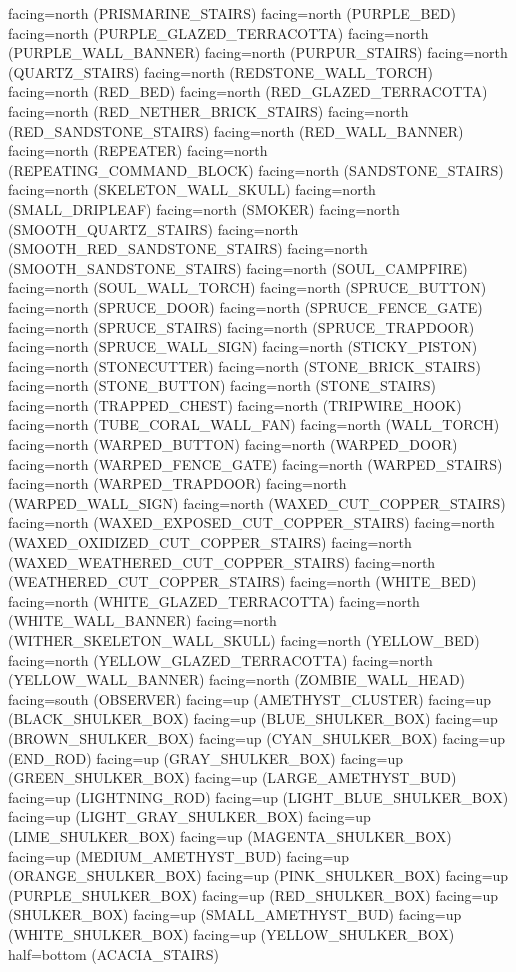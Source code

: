 \documentclass[11pt]{article}
\begin{document}
facing=north (PRISMARINE_STAIRS)
facing=north (PURPLE_BED)
facing=north (PURPLE_GLAZED_TERRACOTTA)
facing=north (PURPLE_WALL_BANNER)
facing=north (PURPUR_STAIRS)
facing=north (QUARTZ_STAIRS)
facing=north (REDSTONE_WALL_TORCH)
facing=north (RED_BED)
facing=north (RED_GLAZED_TERRACOTTA)
facing=north (RED_NETHER_BRICK_STAIRS)
facing=north (RED_SANDSTONE_STAIRS)
facing=north (RED_WALL_BANNER)
facing=north (REPEATER)
facing=north (REPEATING_COMMAND_BLOCK)
facing=north (SANDSTONE_STAIRS)
facing=north (SKELETON_WALL_SKULL)
facing=north (SMALL_DRIPLEAF)
facing=north (SMOKER)
facing=north (SMOOTH_QUARTZ_STAIRS)
facing=north (SMOOTH_RED_SANDSTONE_STAIRS)
facing=north (SMOOTH_SANDSTONE_STAIRS)
facing=north (SOUL_CAMPFIRE)
facing=north (SOUL_WALL_TORCH)
facing=north (SPRUCE_BUTTON)
facing=north (SPRUCE_DOOR)
facing=north (SPRUCE_FENCE_GATE)
facing=north (SPRUCE_STAIRS)
facing=north (SPRUCE_TRAPDOOR)
facing=north (SPRUCE_WALL_SIGN)
facing=north (STICKY_PISTON)
facing=north (STONECUTTER)
facing=north (STONE_BRICK_STAIRS)
facing=north (STONE_BUTTON)
facing=north (STONE_STAIRS)
facing=north (TRAPPED_CHEST)
facing=north (TRIPWIRE_HOOK)
facing=north (TUBE_CORAL_WALL_FAN)
facing=north (WALL_TORCH)
facing=north (WARPED_BUTTON)
facing=north (WARPED_DOOR)
facing=north (WARPED_FENCE_GATE)
facing=north (WARPED_STAIRS)
facing=north (WARPED_TRAPDOOR)
facing=north (WARPED_WALL_SIGN)
facing=north (WAXED_CUT_COPPER_STAIRS)
facing=north (WAXED_EXPOSED_CUT_COPPER_STAIRS)
facing=north (WAXED_OXIDIZED_CUT_COPPER_STAIRS)
facing=north (WAXED_WEATHERED_CUT_COPPER_STAIRS)
facing=north (WEATHERED_CUT_COPPER_STAIRS)
facing=north (WHITE_BED)
facing=north (WHITE_GLAZED_TERRACOTTA)
facing=north (WHITE_WALL_BANNER)
facing=north (WITHER_SKELETON_WALL_SKULL)
facing=north (YELLOW_BED)
facing=north (YELLOW_GLAZED_TERRACOTTA)
facing=north (YELLOW_WALL_BANNER)
facing=north (ZOMBIE_WALL_HEAD)
facing=south (OBSERVER)
facing=up (AMETHYST_CLUSTER)
facing=up (BLACK_SHULKER_BOX)
facing=up (BLUE_SHULKER_BOX)
facing=up (BROWN_SHULKER_BOX)
facing=up (CYAN_SHULKER_BOX)
facing=up (END_ROD)
facing=up (GRAY_SHULKER_BOX)
facing=up (GREEN_SHULKER_BOX)
facing=up (LARGE_AMETHYST_BUD)
facing=up (LIGHTNING_ROD)
facing=up (LIGHT_BLUE_SHULKER_BOX)
facing=up (LIGHT_GRAY_SHULKER_BOX)
facing=up (LIME_SHULKER_BOX)
facing=up (MAGENTA_SHULKER_BOX)
facing=up (MEDIUM_AMETHYST_BUD)
facing=up (ORANGE_SHULKER_BOX)
facing=up (PINK_SHULKER_BOX)
facing=up (PURPLE_SHULKER_BOX)
facing=up (RED_SHULKER_BOX)
facing=up (SHULKER_BOX)
facing=up (SMALL_AMETHYST_BUD)
facing=up (WHITE_SHULKER_BOX)
facing=up (YELLOW_SHULKER_BOX)
half=bottom (ACACIA_STAIRS)
\end{document}
